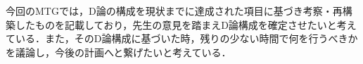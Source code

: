 \documentclass[16pt]{jsarticle}
\begin{document}
		
	\articleSPRobj
		今回のMTGでは，D論の構成を現状までに達成された項目に基づき考察・再構築したものを記載しており，先生の意見を踏まえD論構成を確定させたいと考えている．また，そのD論構成に基づいた時，残りの少ない時間で何を行うべきかを議論し，今後の計画へと繋げたいと考えている．
		

	\articleSPRitemsone
		
		\tableofcontents
		
		
	\articleSPRitemstwo
	\renewcommand{\labelitemi}{$\blacktriangledown$}
	\newcommand{\argmax}{\mathop{\rm arg~max}\limits}
	\newcommand{\argmin}{\mathop{\rm arg~min}\limits}
	\newcommand{\Ker}{{\rm Ker}}
	\newcommand{\rank}{{\rm rank}}
\end{document}
